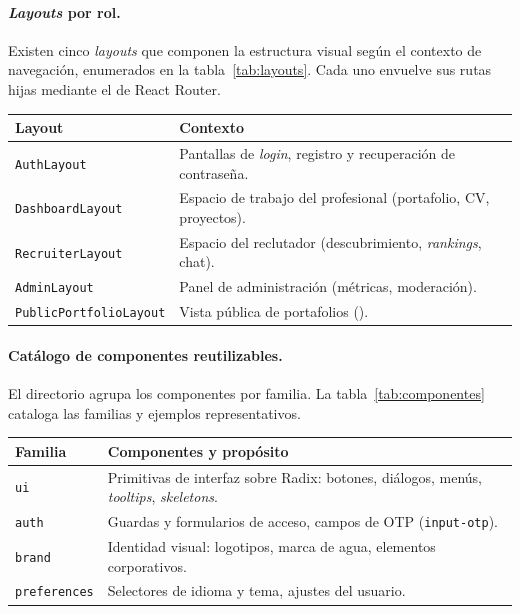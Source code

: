 \paragraph{\textit{Layouts} por rol.} Existen cinco \textit{layouts} que componen la
estructura visual según el contexto de navegación, enumerados en la
tabla~\ref{tab:layouts}. Cada uno envuelve sus rutas hijas mediante el 
de React Router.

\vspace{0.2cm}
\noindent
\renewcommand{\arraystretch}{1.3}
\fontsize{8.5}{10.2}\selectfont\sffamily
\begin{tabularx}{\textwidth}{|L{3.6cm}|Y|}
\hline
{}
\sffamily\textbf{Layout} & \sffamily\textbf{Contexto} \\
\hline
\texttt{AuthLayout} & Pantallas de \textit{login}, registro y recuperación de contraseña. \\ \hline
{}
\texttt{DashboardLayout} & Espacio de trabajo del profesional (portafolio, CV, proyectos). \\ \hline
\texttt{RecruiterLayout} & Espacio del reclutador (descubrimiento, \textit{rankings}, chat). \\ \hline
{}
\texttt{AdminLayout} & Panel de administración (métricas, moderación). \\ \hline
\texttt{PublicPortfolioLayout} & Vista pública de portafolios (). \\ \hline
\end{tabularx}
\label{tab:layouts}

\paragraph{Catálogo de componentes reutilizables.} El directorio 
agrupa los componentes por familia. La tabla~\ref{tab:componentes} cataloga las familias
y ejemplos representativos.

\vspace{0.2cm}
\noindent
\renewcommand{\arraystretch}{1.3}
\fontsize{8.5}{10.2}\selectfont\sffamily
\begin{tabularx}{\textwidth}{|L{2.8cm}|Y|}
\hline
{}
\sffamily\textbf{Familia} & \sffamily\textbf{Componentes y propósito} \\
\hline
\texttt{ui} & Primitivas de interfaz sobre Radix: botones, diálogos, menús, \textit{tooltips}, \textit{skeletons}. \\ \hline
{}
\texttt{auth} & Guardas y formularios de acceso, campos de OTP (\texttt{input-otp}). \\ \hline
\texttt{brand} & Identidad visual: logotipos, marca de agua, elementos corporativos. \\ \hline
{}
\texttt{preferences} & Selectores de idioma y tema, ajustes del usuario. \\ \hline
\end{tabularx}
\label{tab:componentes}

